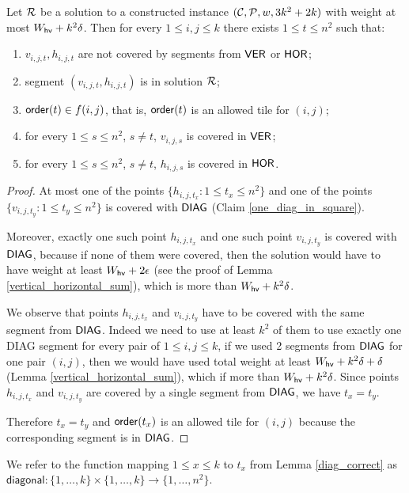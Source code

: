 \begin{lemma}
\label{diag_correct}
Let $\mathcal{R}$ be a solution to a constructed instance $(\mathcal{C}, \mathcal{P}, w, 3k^2+2k)$
with weight at most  $W_{\mathsf{hv}}+k^2\delta$.
Then for every $1 \le i,j \le k$
there exists $1 \le t \le n^2$ such that:
\begin{enumerate}[label={(\arabic*)}]
\item $v_{i,j,t}, h_{i,j,t}$ are not covered by segments from $\mathsf{VER}$ or $\mathsf{HOR}$;
\item segment $(v_{i,j,t}, h_{i,j,t})$ is in solution $\mathcal{R}$;
\item $\mathsf{order}(t) \in f(i,j)$, that is, $\mathsf{order}(t)$ is an allowed tile for $(i,j)$;
\item for every $1 \le s\le n^2$, $s \neq t$, $v_{i,j,s}$ is covered in $\mathsf{VER}$;
\item for every $1 \le s\le n^2$, $s \neq t$, $h_{i,j,s}$ is covered in $\mathsf{HOR}$.
\end{enumerate}
\end{lemma}

\begin{proof}
At most one of the points $\{h_{i,j,t_x} : 1 \le t_x \le n^2\}$
and one of the points $\{v_{i,j,t_y} : 1 \le t_y \le n^2\}$
is covered with $\mathsf{DIAG}$
(Claim \ref{one_diag_in_square}).
	
Moreover, exactly one such point $h_{i,j,t_x}$ and one such point $v_{i,j,t_y}$
is covered with $\mathsf{DIAG}$,
because if none of them were covered, then the solution would have to
have weight at least $W_{\mathsf{hv}} + 2\epsilon$ (see the proof of Lemma \ref{vertical_horizontal_sum}),
which is more than $W_{\mathsf{hv}}+k^2\delta$.

We observe that points $h_{i,j,t_x}$ and $v_{i,j,t_y}$
have to be covered with the same segment from $\mathsf{DIAG}$.
Indeed we need to use at least $k^2$ of them to use
exactly one DIAG segment for every pair of $1 \le i,j \le k$,
if we used 2 segments from $\mathsf{DIAG}$
for one pair $(i,j)$,
then we would have used total weight at least
$W_{\mathsf{hv}} + k^2\delta + \delta$ (Lemma \ref{vertical_horizontal_sum}),
which if more than $W_{\mathsf{hv}}+k^2\delta$.
Since points $h_{i,j,t_x}$ and $v_{i,j,t_y}$ are covered by
a single segment from $\mathsf{DIAG}$, we have $t_x = t_y$.

Therefore $t_x = t_y$
and $\mathsf{order}(t_x)$ is an allowed tile for $(i,j)$
because the corresponding segment is in $\mathsf{DIAG}$.
\end{proof}

\newcommand{\diagonal}{\mathsf{diagonal}}
We refer to the function mapping $1 \le x \le k$ to $t_x$ from Lemma \ref{diag_correct}
as $\diagonal : \{1, \ldots, k\} \times \{1, \ldots, k\} \rightarrow \{1, \ldots, n^2\}$.

